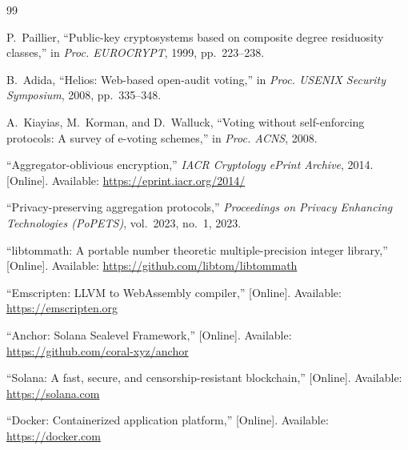 \documentclass[11pt, a4paper]{article}
\begin{document}
\begin{thebibliography}{99}

P.~Paillier, ``Public-key cryptosystems based on composite degree residuosity classes,'' in \emph{Proc. EUROCRYPT}, 1999, pp.~223--238.

B.~Adida, ``Helios: Web-based open-audit voting,'' in \emph{Proc. USENIX Security Symposium}, 2008, pp.~335--348.

A.~Kiayias, M.~Korman, and D.~Walluck, ``Voting without self-enforcing protocols: A survey of e-voting schemes,'' in \emph{Proc. ACNS}, 2008.

``Aggregator-oblivious encryption,'' \emph{IACR Cryptology ePrint Archive}, 2014. [Online]. Available: \url{https://eprint.iacr.org/2014/}

``Privacy-preserving aggregation protocols,'' \emph{Proceedings on Privacy Enhancing Technologies (PoPETS)}, vol.~2023, no.~1, 2023.

``libtommath: A portable number theoretic multiple-precision integer library,'' [Online]. Available: \url{https://github.com/libtom/libtommath}

``Emscripten: LLVM to WebAssembly compiler,'' [Online]. Available: \url{https://emscripten.org}

``Anchor: Solana Sealevel Framework,'' [Online]. Available: \url{https://github.com/coral-xyz/anchor}

``Solana: A fast, secure, and censorship-resistant blockchain,'' [Online]. Available: \url{https://solana.com}

``Docker: Containerized application platform,'' [Online]. Available: \url{https://docker.com}

\end{thebibliography}
\end{document}
